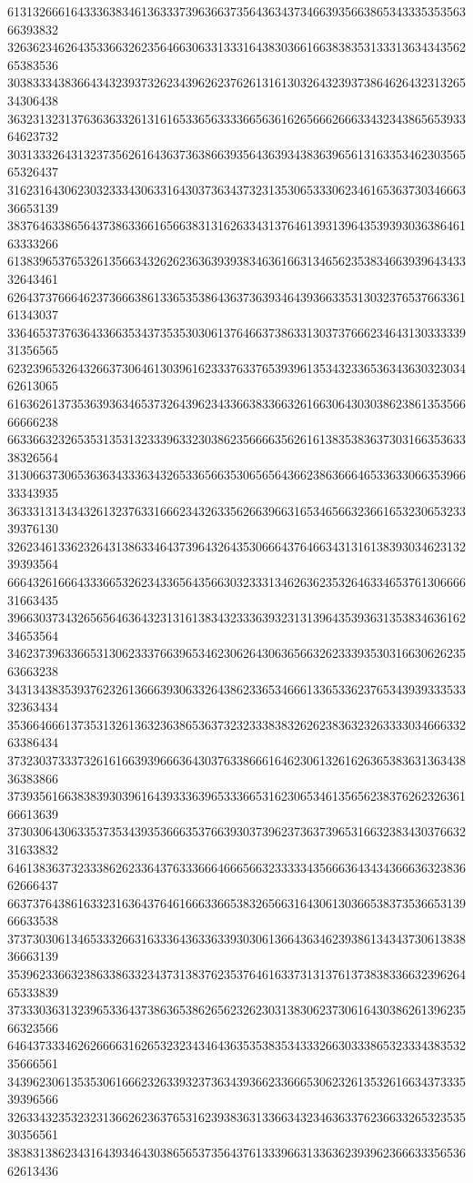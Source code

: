 61313266616433363834613633373963663735643634373466393566386534333535356366393832
32636234626435336632623564663063313331643830366166383835313331363434356265383536
30383334383664343239373262343962623762613161303264323937386462643231326534306438
36323132313763636332613161653365633336656361626566626663343234386565393364623732
30313332643132373562616436373638663935643639343836396561316335346230356565326437
31623164306230323334306331643037363437323135306533306234616536373034666336653139
38376463386564373863366165663831316263343137646139313964353939303638646163333266
61383965376532613566343262623636393938346361663134656235383466393964343332643461
62643737666462373666386133653538643637363934643936633531303237653766336161343037
33646537376364336635343735353030613764663738633130373766623464313033333931356565
62323965326432663730646130396162333763376539396135343233653634363032303462613065
61636261373536393634653732643962343366383366326166306430303862386135356666666238
66336632326535313531323339633230386235666635626161383538363730316635363338326564
31306637306536363433363432653365663530656564366238636664653363306635396633343935
36333131343432613237633166623432633562663966316534656632366165323065323339376130
32623461336232643138633464373964326435306664376466343131613839303462313239393564
66643261666433366532623433656435663032333134626362353264633465376130666631663435
39663037343265656463643231316138343233363932313139643539363135383463616234653564
34623739633665313062333766396534623062643063656632623339353031663062623563663238
34313438353937623261366639306332643862336534666133653362376534393933353332363434
35366466613735313261363236386536373232333838326262383632326333303466633263386434
37323037333732616166393966636430376338666164623061326162636538363136343836383866
37393561663838393039616439333639653336653162306534613565623837626232636166613639
37303064306335373534393536663537663930373962373637396531663238343037663231633832
64613836373233386262336437633366646665663233333435666364343436663632383662666437
66373764386163323163643764616663366538326566316430613036653837353665313966633538
37373030613465333266316333643633633930306136643634623938613434373061383836663139
35396233663238633863323437313837623537646163373131376137383833663239626465333839
37333036313239653364373863653862656232623031383062373061643038626139623566323566
64643733346262666631626532323434643635353835343332663033386532333438353235666561
34396230613535306166623263393237363439366233666530623261353261663437333539396566
32633432353232313662623637653162393836313366343234636337623663326532353530356561
38383138623431643934643038656537356437613339663133636239396236663335653662613436
